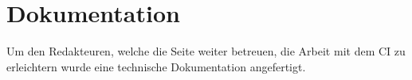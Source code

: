 \section{Dokumentation}
\label{sec:Dokumentation}

Um den Redakteuren, welche die Seite weiter betreuen, die Arbeit mit dem \acs{CI} zu erleichtern wurde eine 
technische Dokumentation angefertigt.
